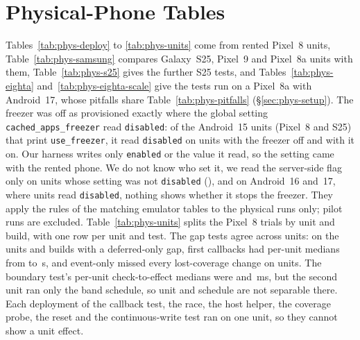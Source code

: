 \setcounter{topnumber}{5}\setcounter{dbltopnumber}{5}\setcounter{totalnumber}{8}
\renewcommand{\topfraction}{0.95}\renewcommand{\dbltopfraction}{0.95}\renewcommand{\textfraction}{0.05}
\renewcommand{\floatpagefraction}{0.75}\renewcommand{\dblfloatpagefraction}{0.75}
\section{Physical-Phone Tables}
\label{app:phys}
Tables~\ref{tab:phys-deploy} to \ref{tab:phys-units} come from rented Pixel~8 units, Table~\ref{tab:phys-samsung} compares Galaxy~S25, Pixel~9 and Pixel~8a units with them, Table~\ref{tab:phys-s25} gives the further S25 tests, and Tables~\ref{tab:phys-eighta} and~\ref{tab:phys-eighta-scale} give the tests run on a Pixel~8a with Android~17, whose pitfalls share Table~\ref{tab:phys-pitfalls} (\S\ref{sec:phys-setup}). The freezer was off as provisioned exactly where the global setting \texttt{cached\_apps\_freezer} read \texttt{disabled}: of the \PhysFreezerCfgShown Android~15 units (Pixel~8 and S25) that print \texttt{use\_freezer}, it read \texttt{disabled} on \PhysFreezerCfgOffDisabled units with the freezer off and \PhysFreezerCfgOnDisabled with it on. Our harness writes only \texttt{enabled} or the value it read, so the setting came with the rented phone. We do not know who set it, we read the server-side flag only on units whose setting was not \texttt{disabled} (\PhysFreezerCfgFlagDisabled), and on Android~16 and~17, where \PhysFreezerCfgHiddenDisabled units read \texttt{disabled}, nothing shows whether it stops the freezer. They apply the rules of the matching emulator tables to the physical runs only; pilot runs are excluded. Table~\ref{tab:phys-units} splits the Pixel~8 trials by unit and build, with one row per unit and test. The gap tests agree across units: on the \PhysUnitsDeferred units and \PhysUnitsDeferredBuilds builds with a deferred-only gap, first callbacks had per-unit medians from \PhysUnitFclMin to \PhysUnitFclMax\,s, and event-only missed every lost-coverage change on \PhysUnitsLostAll units. The boundary test's per-unit check-to-effect medians were \PhysUnitCteMin and \PhysUnitCteMax\,ms, but the second unit ran only the band schedule, so unit and schedule are not separable there. Each deployment of the callback test, the race, the host helper, the coverage probe, the reset and the continuous-write test ran on one unit, so they cannot show a unit effect.

